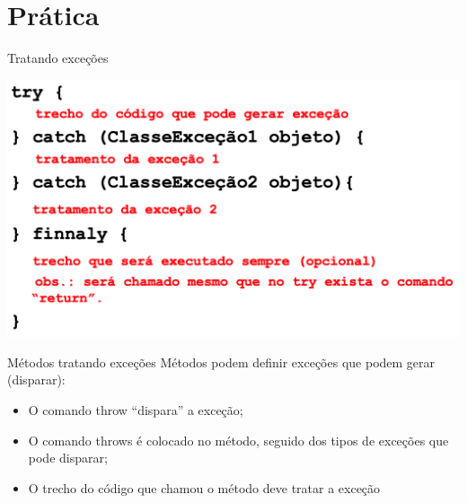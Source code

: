 \documentclass[11pt,aspectratio=43,ignorenonframetext,t]{beamer}
\begin{document}
\section{Prática}
\begin{frame}{Tratando exceções}
    \begin{center}
        \includegraphics[height=0.7\paperheight]{fig/aula20/try_catch.png} \\
    \end{center}  
\end{frame}
\begin{frame}{Métodos tratando exceções}
    Métodos podem definir exceções que podem gerar (disparar):
    \begin{itemize}
        \item O comando throw “dispara” a exceção;
        \item O comando throws é colocado no método, seguido dos tipos de exceções que pode disparar;
        \item O trecho do código que chamou o método deve tratar a exceção
    \end{itemize}
\end{frame}
\end{document}
